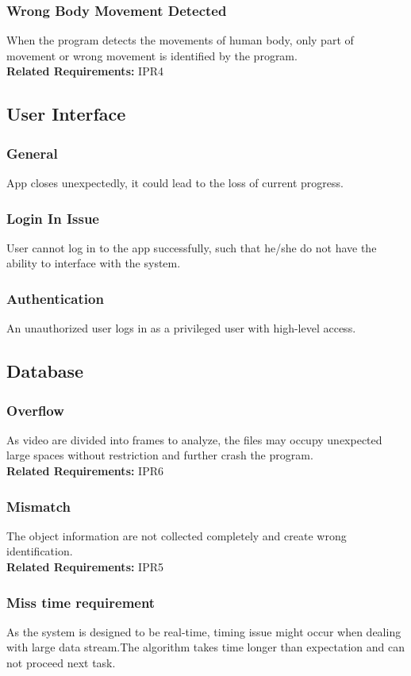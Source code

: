 \documentclass{article}
\begin{document}
\subsubsection{Wrong Body Movement Detected}
When the program detects the movements of human body, only part of movement or wrong movement is identified by the program.\\
\textbf{Related Requirements: }IPR4
\subsection{User Interface}
\subsubsection{General}
App closes unexpectedly, it could lead to the loss of current progress.
\subsubsection{Login In Issue}
User cannot log in to the app successfully, such that he/she do not have the ability to interface with the system.
\subsubsection{Authentication}
An unauthorized user logs in as a privileged user with high-level access.
\subsection{Database}
\subsubsection{Overflow}
As video are divided into frames to analyze, the files may occupy unexpected large spaces without restriction and further crash the program.\\
\textbf{Related Requirements: }IPR6
\subsubsection{Mismatch}
The object information are not collected completely and create wrong identification.\\
\textbf{Related Requirements: }IPR5
\subsubsection{Miss time requirement}
As the system is designed to be real-time, timing issue might occur when dealing with large data stream.The algorithm takes time longer than expectation and can not proceed next task.\\
\end{document}
